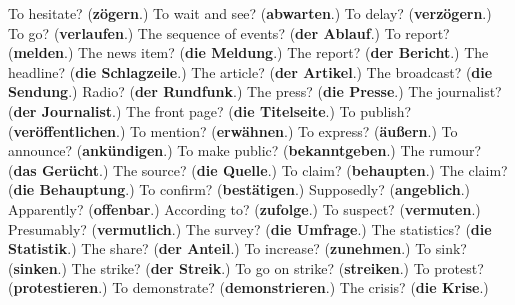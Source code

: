 \begin{tcolorbox}[breakable,colback=teal!4,colframe=teal!35!black,title={Before you move on}]
To hesitate? (\textbf{zögern}.) To wait and see? (\textbf{abwarten}.) To delay? (\textbf{verzögern}.) To go? (\textbf{verlaufen}.) The sequence of events? (\textbf{der Ablauf}.) To report? (\textbf{melden}.) The news item? (\textbf{die Meldung}.) The report? (\textbf{der Bericht}.) The headline? (\textbf{die Schlagzeile}.) The article? (\textbf{der Artikel}.) The broadcast? (\textbf{die Sendung}.) Radio? (\textbf{der Rundfunk}.) The press? (\textbf{die Presse}.) The journalist? (\textbf{der Journalist}.) The front page? (\textbf{die Titelseite}.) To publish? (\textbf{veröffentlichen}.) To mention? (\textbf{erwähnen}.) To express? (\textbf{äußern}.) To announce? (\textbf{ankündigen}.) To make public? (\textbf{bekanntgeben}.) The rumour? (\textbf{das Gerücht}.) The source? (\textbf{die Quelle}.) To claim? (\textbf{behaupten}.) The claim? (\textbf{die Behauptung}.) To confirm? (\textbf{bestätigen}.) Supposedly? (\textbf{angeblich}.) Apparently? (\textbf{offenbar}.) According to? (\textbf{zufolge}.) To suspect? (\textbf{vermuten}.) Presumably? (\textbf{vermutlich}.) The survey? (\textbf{die Umfrage}.) The statistics? (\textbf{die Statistik}.) The share? (\textbf{der Anteil}.) To increase? (\textbf{zunehmen}.) To sink? (\textbf{sinken}.) The strike? (\textbf{der Streik}.) To go on strike? (\textbf{streiken}.) To protest? (\textbf{protestieren}.) To demonstrate? (\textbf{demonstrieren}.) The crisis? (\textbf{die Krise}.)
\end{tcolorbox}

